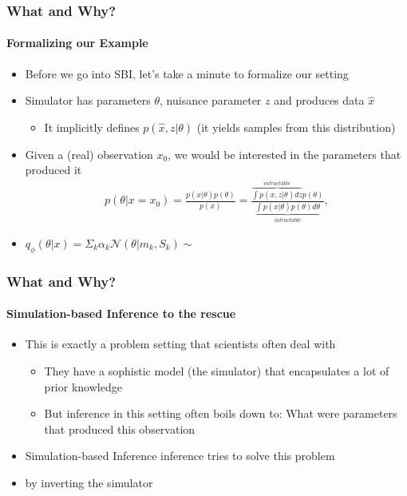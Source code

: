 \documentclass[9pt]{beamer}
\begin{document}
\begin{frame}
\frametitle{What and Why?}
\framesubtitle{Formalizing our Example}
\begin{itemize}
	\item Before we go into SBI, let's take a minute to formalize our setting
	\item Simulator has parameters $\theta$, nuisance parameter $z$ and produces data $\hat{x}$
	\begin{itemize}
		\item It implicitly defines $p(\hat{x},z|\theta)$ (it yields samples from this distribution)
	\end{itemize}
	\item Given a (real) observation $x_0$, we would be interested in the parameters that produced it
	\begin{align}
	p(\theta|x=x_0) = \frac{p(x|\theta)p(\theta)}{p(x)} = \frac{\overbrace{\int p(x,z|\theta)dz}^{intractable} p(\theta)}{\underbrace{\int p(x|\theta)p(\theta)d\theta}_{intractable}},
	\end{align}
\item $q_{\phi}(\theta|x)=\Sigma_k \alpha_k\mathcal{N}(\theta|m_{k}, S_{k}) \sim$
\end{itemize}
\end{frame} 



\begin{frame}
\frametitle{What and Why?}
\framesubtitle{Simulation-based Inference to the rescue}
\begin{itemize}
		\item This is exactly a problem setting that scientists often deal with
	\begin{itemize}
		\item They have a sophistic model (the simulator) that encapsulates a lot of prior knowledge
		\item But inference in this setting often boils down to: What were parameters that produced this observation
	\end{itemize}
	\item Simulation-based Inference inference tries to solve this problem
	\item by inverting the simulator
\end{itemize}
\end{frame} 
\end{document}
